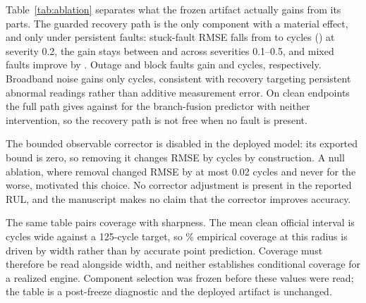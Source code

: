 \CurrentAblationTable
Table~\ref{tab:ablation} separates what the frozen artifact actually gains from
its parts. The guarded recovery path is the only component with a material
effect, and only under persistent faults: stuck-fault RMSE falls from
\CurrentAblationStuckBypass{} to \CurrentAblationStuckFull{} cycles
(\CurrentAblationStuckGain{}) at severity 0.2, the gain stays between
\CurrentAblationStuckGainHigh{} and \CurrentAblationStuckGainLow{} across
severities 0.1--0.5, and mixed faults improve by
\CurrentAblationMixedGain{}. Outage and block faults gain
\CurrentAblationOutageGain{} and \CurrentAblationBlockGain{} cycles,
respectively. Broadband noise gains only \CurrentAblationNoiseGain{} cycles,
consistent with recovery targeting persistent abnormal readings rather than
additive measurement error. On clean endpoints the full path gives
\CurrentAblationCleanFull{} against \CurrentAblationCleanPlain{} for the
branch-fusion predictor with neither intervention, so the recovery path is not
free when no fault is present.

The bounded observable corrector is disabled in the deployed model: its exported bound is
zero, so removing it changes RMSE by \CurrentAblationCorrectorDelta{} cycles by
construction. A null ablation, where removal changed
RMSE by at most 0.02 cycles and never for the worse, motivated this choice. No
corrector adjustment is present in the reported RUL, and the manuscript makes no
claim that the corrector improves accuracy.

The same table pairs coverage with sharpness. The mean clean official interval is
\CurrentAblationWidth{} cycles wide against a 125-cycle target, so
\CurrentAblationCoverage{}\% empirical coverage at this radius is driven by width
rather than by accurate point prediction. Coverage must therefore be read
alongside width, and neither establishes conditional coverage for a realized
engine. Component selection was frozen before these values were read; the table
is a post-freeze diagnostic and the deployed artifact is unchanged.
